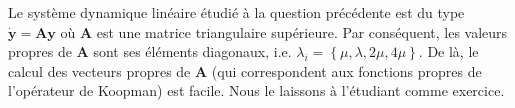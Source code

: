 \documentclass[12pt, answers]{exam}
\begin{document}
\begin{questions}
\begin{parts}
    \begin{solution}
      {\color{blue}
      Le système dynamique linéaire étudié à la question précédente est du type $\dot{\bm{y}} = \bm{A} \bm{y}$ où $\bm{A}$ est une matrice triangulaire supérieure. Par conséquent, les valeurs propres de $\bm{A}$ sont ses éléments diagonaux, i.e. $\lambda_i = \left\{ \mu, \lambda, 2\mu, 4\mu \right\}$. De là, le calcul des vecteurs propres de $\bm{A}$ (qui correspondent aux fonctions propres de l'opérateur de Koopman) est facile. Nous le laissons à l'étudiant comme exercice.
      }
    \end{solution}

  \end{parts}

\end{questions}
\end{document}
